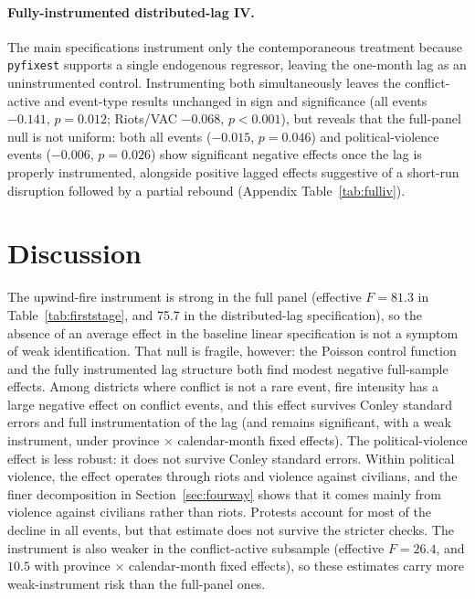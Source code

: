 \documentclass[12pt]{article}
\begin{document}
\paragraph{Fully-instrumented distributed-lag IV.} The main specifications instrument only the contemporaneous treatment because \texttt{pyfixest} supports a single endogenous regressor, leaving the one-month lag as an uninstrumented control. Instrumenting both simultaneously leaves the conflict-active and event-type results unchanged in sign and significance (all events $-0.141$, $p=0.012$; Riots/VAC $-0.068$, $p<0.001$), but reveals that the full-panel null is not uniform: both all events ($-0.015$, $p=0.046$) and political-violence events ($-0.006$, $p=0.026$) show significant negative effects once the lag is properly instrumented, alongside positive lagged effects suggestive of a short-run disruption followed by a partial rebound (Appendix Table~\ref{tab:fulliv}).

\section{Discussion}
\label{sec:discussion}

The upwind-fire instrument is strong in the full panel (effective $F = 81.3$ in Table~\ref{tab:firststage}, and 75.7 in the distributed-lag specification), so the absence of an average effect in the baseline linear specification is not a symptom of weak identification. That null is fragile, however: the Poisson control function and the fully instrumented lag structure both find modest negative full-sample effects. Among districts where conflict is not a rare event, fire intensity has a large negative effect on conflict events, and this effect survives Conley standard errors and full instrumentation of the lag (and remains significant, with a weak instrument, under province $\times$ calendar-month fixed effects). The political-violence effect is less robust: it does not survive Conley standard errors. Within political violence, the effect operates through riots and violence against civilians, and the finer decomposition in Section~\ref{sec:fourway} shows that it comes mainly from violence against civilians rather than riots. Protests account for most of the decline in all events, but that estimate does not survive the stricter checks. The instrument is also weaker in the conflict-active subsample (effective $F = 26.4$, and $10.5$ with province $\times$ calendar-month fixed effects), so these estimates carry more weak-instrument risk than the full-panel ones.
\end{document}
